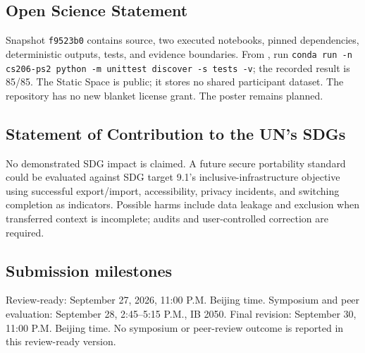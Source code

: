 \subsection*{Open Science Statement}
Snapshot \texttt{f9523b0} contains source, two executed notebooks, pinned dependencies, deterministic outputs, tests, and evidence boundaries. From , run \texttt{conda run -n cs206-ps2 python -m unittest discover -s tests -v}; the recorded result is 85/85. The Static Space is public; it stores no shared participant dataset. The repository has no new blanket license grant. The poster remains planned.

\subsection*{Statement of Contribution to the UN's SDGs}
No demonstrated SDG impact is claimed. A future secure portability standard could be evaluated against SDG target 9.1's inclusive-infrastructure objective~\cite{un_sdg} using successful export/import, accessibility, privacy incidents, and switching completion as indicators. Possible harms include data leakage and exclusion when transferred context is incomplete; audits and user-controlled correction are required.

\subsection*{Submission milestones}
Review-ready: September 27, 2026, 11:00 P.M. Beijing time. Symposium and peer evaluation: September 28, 2:45--5:15 P.M., IB 2050. Final revision: September 30, 11:00 P.M. Beijing time. No symposium or peer-review outcome is reported in this review-ready version.
